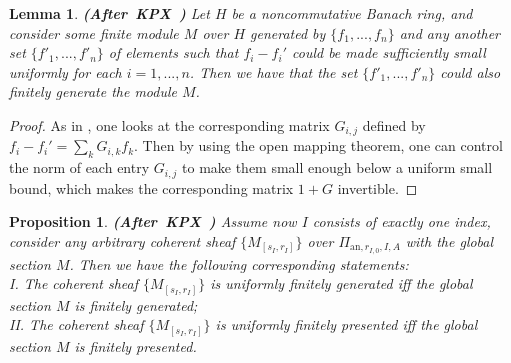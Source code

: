 \documentclass[12pt]{amsart}
\newtheorem{lemma}[theorem]{Lemma}
\newtheorem{proposition}[theorem]{Proposition}
\theoremstyle{definition}
\numberwithin{equation}{section}
\begin{document}
\begin{lemma} \mbox{\bf{(After KPX \cite[Lemma 2.1.12]{KPX})}} \label{lemma6.16}
Let $H$ be a noncommutative Banach ring, and consider some finite module $M$ over $H$ generated by $\{f_1,...,f_n\}$ and any another set $\{f'_1,...,f'_n\}$ of elements such that $f_i-f_i'$ could be made sufficiently small uniformly for each $i=1,...,n$. Then we have that the set $\{f'_1,...,f'_n\}$ could also finitely generate the module $M$.	
\end{lemma}

\begin{proof}
As in \cite[Lemma 2.1.12]{KPX}, one looks at the corresponding matrix $G_{i,j}$ defined by $f_i-f_i'=\sum_{k}G_{i,k}f_k$. Then by using the open mapping theorem, one can control the norm of each entry $G_{i,j}$ to make them small enough below a uniform small bound, which makes the corresponding matrix $1+G$ invertible.	
\end{proof}








\begin{proposition} \mbox{\bf{(After KPX \cite[Proposition 2.1.13]{KPX})}} \label{prop1}
Assume now $I$ consists of exactly one index, consider any arbitrary coherent sheaf $\{M_{[s_I,r_I]}\}$ over $\Pi_{\mathrm{an},r_{I,0},I,A}$ with the global section $M$. Then we have the following corresponding statements:\\
I.	The coherent sheaf $\{M_{[s_I,r_I]}\}$ is uniformly finitely generated iff the global section $M$ is finitely generated;\\
II. The coherent sheaf $\{M_{[s_I,r_I]}\}$ is uniformly finitely presented iff the global section $M$ is finitely presented.
\end{proposition}
\end{document}
